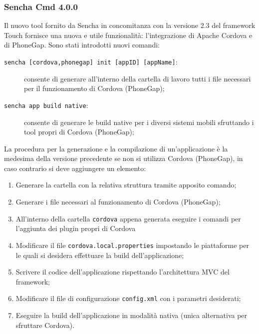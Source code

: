 \subsubsection{Sencha Cmd 4.0.0}
Il nuovo tool fornito da Sencha in concomitanza con la versione 2.3 del framework Touch fornisce una nuova e utile funzionalità: l'integrazione di Apache Cordova e di PhoneGap.
Sono stati introdotti nuovi comandi:
\begin{description}
\item[\texttt{sencha [cordova,phonegap] init [appID] [appName]}:] consente di generare all'interno della cartella di lavoro tutti i file necessari per il funzionamento di Cordova (PhoneGap);
\item[\texttt{sencha app build native}:] consente di generare le build native per i diversi sistemi mobili sfruttando i tool propri di Cordova (PhoneGap);
\end{description}

La procedura per la generazione e la compilazione di un'applicazione è la medesima della versione precedente se non si utilizza Cordova (PhoneGap), in caso contrario si deve aggiungere un elemento:
\begin{enumerate}
\item Generare la cartella con la relativa struttura tramite apposito comando;
\item Generare i file necessari al funzionamento di Cordova (PhoneGap);
\item All'interno della cartella \texttt{cordova} appena generata eseguire i comandi per l'aggiunta dei plugin propri di Cordova
\item Modificare il file \texttt{cordova.local.properties} impostando le piattaforme per le quali si desidera effettuare la build dell'applicazione;
\item Scrivere il codice dell'applicazione rispettando l'architettura MVC del framework;
\item Modificare il file di configurazione \texttt{config.xml} con i parametri desiderati;
\item Eseguire la build dell'applicazione in modalità nativa (unica alternativa per sfruttare Cordova).
\end{enumerate}

\label{sec:cordova}
